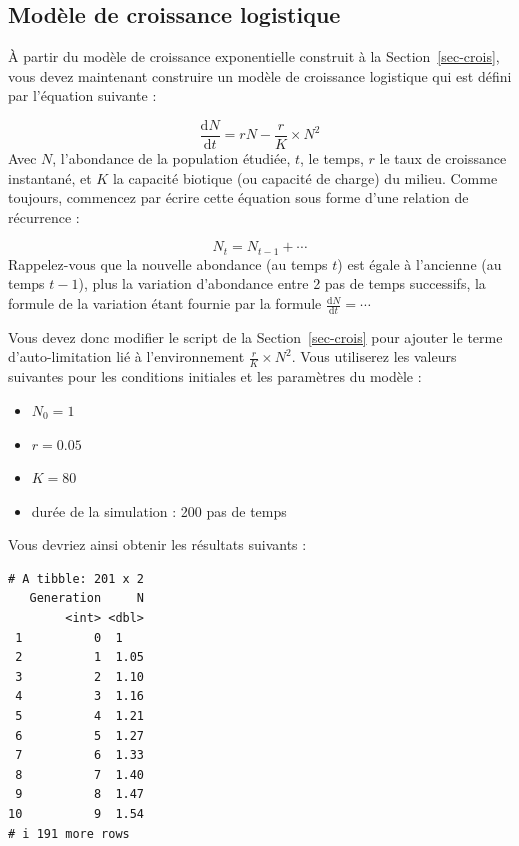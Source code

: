 \documentclass[
  french,
  a4paper,
  DIV=11,
  numbers=noendperiod,
  oneside]{scrreprt}
\providecommand{\tightlist}{%
  \setlength{\itemsep}{0pt}\setlength{\parskip}{0pt}}
\begin{document}
\begin{tcolorbox}
\section{Modèle de croissance logistique}\label{sec-logist}

À partir du modèle de croissance exponentielle construit à la
Section~\ref{sec-crois}, vous devez maintenant construire un modèle de
croissance logistique qui est défini par l'équation suivante :

\[\frac{\mathrm{d}N}{\mathrm{d}t} = rN - \frac{r}{K}\times N^2\] Avec
\(N\), l'abondance de la population étudiée, \(t\), le temps, \(r\) le
taux de croissance instantané, et \(K\) la capacité biotique (ou
capacité de charge) du milieu. Comme toujours, commencez par écrire
cette équation sous forme d'une relation de récurrence :

\[N_{t} = N_{t - 1} + \cdots{}\] Rappelez-vous que la nouvelle abondance
(au temps \(t\)) est égale à l'ancienne (au temps \(t-1\)), plus la
variation d'abondance entre 2 pas de temps successifs, la formule de la
variation étant fournie par la formule
\(\frac{\mathrm{d}N}{\mathrm{d}t} = \cdots{}\)

Vous devez donc modifier le script de la Section~\ref{sec-crois} pour
ajouter le terme d'auto-limitation lié à l'environnement
\(\frac{r}{K}\times N^2\). Vous utiliserez les valeurs suivantes pour
les conditions initiales et les paramètres du modèle :

\begin{itemize}
\tightlist
\item
  \(N_0 = 1\)
\item
  \(r = 0.05\)
\item
  \(K = 80\)
\item
  durée de la simulation : 200 pas de temps
\end{itemize}

Vous devriez ainsi obtenir les résultats suivants :

\begin{verbatim}
# A tibble: 201 x 2
   Generation     N
        <int> <dbl>
 1          0  1   
 2          1  1.05
 3          2  1.10
 4          3  1.16
 5          4  1.21
 6          5  1.27
 7          6  1.33
 8          7  1.40
 9          8  1.47
10          9  1.54
# i 191 more rows
\end{verbatim}

{
\makeatletter
\def\LT@makecaption#1#2#3{%
  \noalign{\smash{\hbox{\kern\textwidth\rlap{\kern\marginparsep
  \parbox[t]{\marginparwidth}{%
    \footnotesize{%
      \vspace{(1.1\baselineskip)}
    #1{#2: }\ignorespaces #3}}}}}}%
    }
\makeatother

}
\end{tcolorbox}
\end{document}
